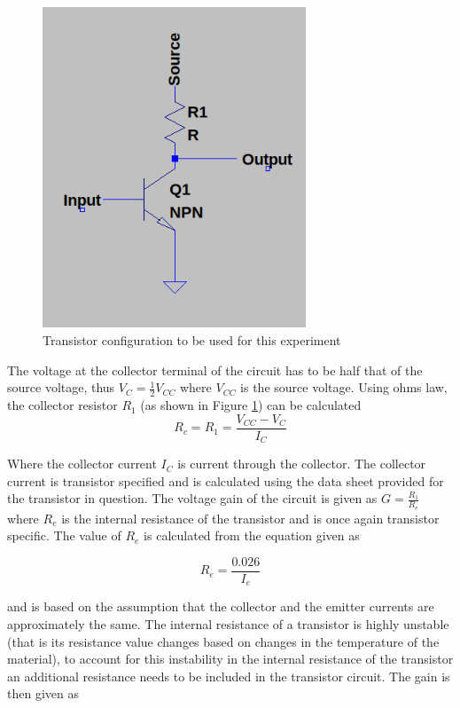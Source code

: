 \documentclass[12pt, a4paper]{article}
\begin{document}
	 \begin{figure}[H]
	 	\centering
		\includegraphics[width=0.7\textwidth]{images/transistor_configuration_circuit.png}
		\caption{Transistor configuration to be used for this experiment}
		\label{fig:transistor_configuration_circuit}
	 \end{figure}

 	The voltage at the collector terminal of the circuit has to be half that of the source voltage, thus $V_C = \frac{1}{2}V_{CC}$ where $V_{CC}$ is the source voltage. Using ohms law, the collector resistor $R_1$ (as shown in Figure \ref{fig:transistor_configuration_circuit}) can be calculated
 	\begin{equation}
 		R_c = R_1 = \frac{V_{CC}-V_C}{I_C}
 	\end{equation}

 	Where the collector current $I_C$ is current through the collector. The collector current is transistor specified and is calculated using the data sheet provided for the transistor in question. The voltage gain of the circuit is given as $G = \frac{R_1}{R_e}$ where $R_e$ is the internal resistance of the transistor and is once again transistor specific. The value of $R_e$ is calculated from the equation given as 

 	\begin{equation}
 		R_e = \frac{0.026}{I_e}
 	\end{equation}

 	and is based on the assumption that the collector and the emitter currents are approximately the same. The internal resistance of a transistor is highly unstable (that is its resistance value changes based on changes in the temperature of the material), to account for this instability in the internal resistance of the transistor an additional resistance needs to be included in the transistor circuit. The gain is then given as 
\end{document}

